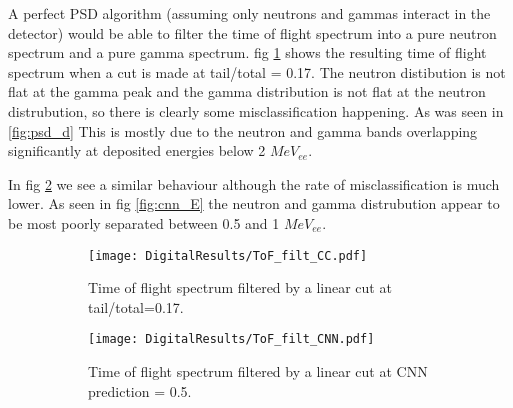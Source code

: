 \documentclass[main.tex]{subfiles}
\begin{document}
A perfect PSD algorithm (assuming only neutrons and gammas interact in the detector) would be able to filter the time of flight spectrum into a pure neutron spectrum and a pure gamma spectrum. fig \ref{fig:tof_filt_cc} shows the resulting time of flight spectrum when a cut is made at tail/total = 0.17. The neutron distibution is not flat at the gamma peak and the gamma distribution is not flat at the neutron distrubution, so there is clearly some misclassification happening. As was seen in \ref{fig:psd_d} This is mostly due to the neutron and gamma bands overlapping significantly at deposited energies below 2 $MeV_{ee}$.

In fig \ref{fig:tof_digi_filt_cnn} we see a similar behaviour although the rate of misclassification is much lower. As seen in fig \ref{fig:cnn_E} the neutron and gamma distrubution appear to be most poorly separated between 0.5 and 1 $MeV_{ee}$.

\begin{figure}
    \centering
    \begin{subfigure}[bh]{\textwidth}
   	    \centering
        \texttt{[image: DigitalResults/ToF\_filt\_CC.pdf]}
        \caption{Time of flight spectrum filtered by a linear cut at tail/total=0.17.}
        \label{fig:tof_filt_cc}
    \end{subfigure}
	\begin{subfigure}[bh]{\textwidth}
	    \centering
        \texttt{[image: DigitalResults/ToF\_filt\_CNN.pdf]}
        \caption{Time of flight spectrum filtered by a linear cut at CNN prediction = 0.5.}
        \label{fig:tof_digi_filt_cnn}
    \end{subfigure}
    \caption{}
    \label{fig:tof_cc_cnn}
\end{figure}
\end{document}
